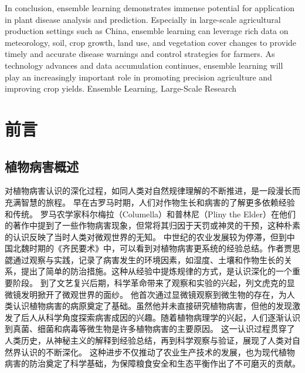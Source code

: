 \documentclass[AutoFakeBold]{LZUThesis-PgD&PhD}
\begin{document}
{		In conclusion, ensemble learning demonstrates immense potential for application in plant disease analysis and prediction. Especially in large-scale agricultural production settings such as China, ensemble learning can leverage rich data on meteorology, soil, crop growth, land use, and vegetation cover changes to provide timely and accurate disease warnings and control strategies for farmers. As technology advances and data accumulation continues, ensemble learning will play an increasingly important role in promoting precision agriculture and improving crop yields.    %
	}{Ensemble Learning, Large-Scale Research}
	
	
	\mainmatter
	
	
	
	\chapter{前言}
	
	\section{植物病害概述}
	
	
	对植物病害认识的深化过程，如同人类对自然规律理解的不断推进，是一段漫长而充满智慧的旅程。
	早在古罗马时期，人们对作物生长和病害的了解更多依赖经验和传统。
	罗马农学家科尔梅拉（Columella）和普林尼（Pliny the Elder）在他们的著作中提到了一些作物病害现象，但常将其归因于天罚或神灵的干预，这种朴素的认识反映了当时人类对微观世界的无知。
	中世纪的农业发展较为停滞，但到中国北魏时期的《齐民要术》中，可以看到对植物病害更系统的经验总结。作者贾思勰通过观察与实践，记录了病害发生的环境因素，如湿度、土壤和作物生长的关系，提出了简单的防治措施。这种从经验中提炼规律的方式，是认识深化的一个重要阶段。
	到了文艺复兴后期，科学革命带来了观察和实验的兴起，列文虎克的显微镜发明掀开了微观世界的面纱。
	他首次通过显微镜观察到微生物的存在，为人类认识植物病害的病原奠定了基础。虽然他并未直接研究植物病害，但他的发现激发了后人从科学角度探索病害成因的兴趣。随着植物病理学的兴起，人们逐渐认识到真菌、细菌和病毒等微生物是许多植物病害的主要原因。
	这一认识过程贯穿了人类历史，从神秘主义的解释到经验总结，再到科学观察与验证，展现了人类对自然界认识的不断深化。
	这种进步不仅推动了农业生产技术的发展，也为现代植物病害的防治奠定了科学基础，为保障粮食安全和生态平衡作出了不可磨灭的贡献。
	
\end{document}
